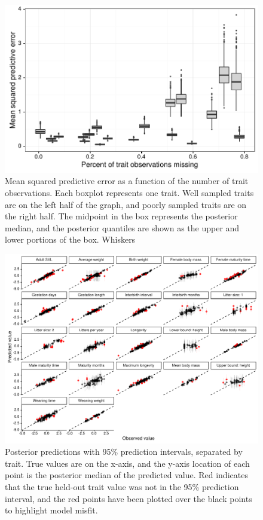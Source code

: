 \begin{figure}[ht]\centering
\includegraphics[width=\linewidth]{figs/ch5/mse.pdf}
\caption[Mean squared predictive error as a function of the number of trait observations]{Mean squared predictive error as a function of the number of trait observations. Each boxplot represents one trait. Well sampled traits are on the left half of the graph, and poorly sampled traits are on the right half. The midpoint in the box represents the posterior median, and the posterior quantiles are shown as the upper and lower portions of the box. Whiskers }
\label{fig:mse}
\end{figure}

\begin{figure}[ht]\centering
\includegraphics[width=\linewidth]{figs/ch5/by_trait.pdf}
\caption[Posterior predictions with 95\% prediction intervals, separated by trait]{Posterior predictions with 95\% prediction intervals, separated by trait. True values are on the x-axis, and the y-axis location of each point is the posterior median of the predicted value. Red indicates that the true held-out trait value was not in the 95\% prediction interval, and the red points have been plotted over the black points to highlight model misfit.}
\label{fig:by_trait}
\end{figure}
